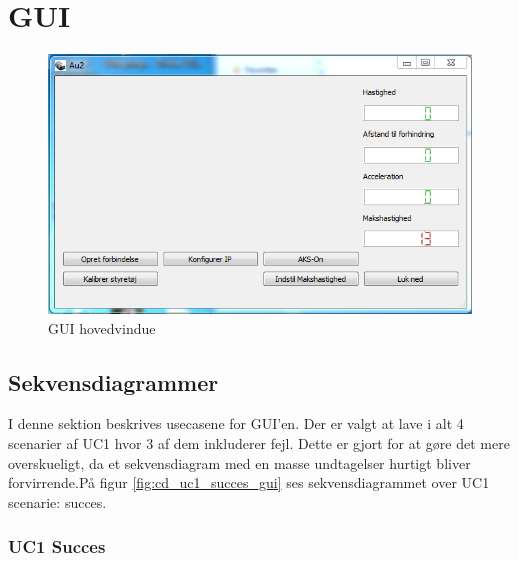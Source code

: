 \clearpage
\section{GUI} \label{sec:GUI}

\begin{figure}[H]
\centering
\includegraphics[width=\textwidth* 3/4,height=\textwidth* 9/20 ]{../fig/billeder/gui_start.png}
\caption{GUI hovedvindue}
\label{fig:GUI_hovedvindue}
\end{figure}

\subsection{Sekvensdiagrammer}

I denne sektion beskrives usecasene for GUI'en. Der er valgt at lave i alt 4 scenarier af UC1 hvor 3 af dem inkluderer fejl. Dette er gjort for at gøre det mere overskueligt, da et sekvensdiagram med en masse undtagelser hurtigt bliver forvirrende.På figur
\ref{fig:cd_uc1_succes_gui} ses sekvensdiagrammet over UC1 scenarie: succes.

\subsubsection{UC1 Succes}

